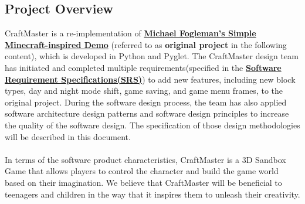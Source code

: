 \documentclass[12pt, titlepage]{article}
\begin{document}
\subsection{Project Overview}
CraftMaster is a re-implementation of \href{https://github.com/fogleman/Minecraft}{\textbf{Michael Fogleman's Simple Minecraft-inspired Demo}} (referred to as \textbf{original project} in the following content), which is developed in Python and Pyglet. The CraftMaster design team has initiated and completed multiple requirements(specified in the \href{https://gitlab.cas.mcmaster.ca/wangs132/minecraft/-/blob/master/Doc/SRS/SRS.pdf}{\textbf{Software Requirement Specifications(SRS)}}) to add new features, including new block types, day and night mode shift, game saving, and game menu frames, to the original project. During the software design process, the team has also applied software architecture design patterns and software design principles to increase the quality of the software design. The specification of those design methodologies will be described in this document.\\\\
In terms of the software product characteristics, CraftMaster is a 3D Sandbox Game that allows players to control the character and build the game world based on their imagination. We believe that CraftMaster will be beneficial to teenagers and children in the way that it inspires them to unleash their creativity. 
\end{document}

